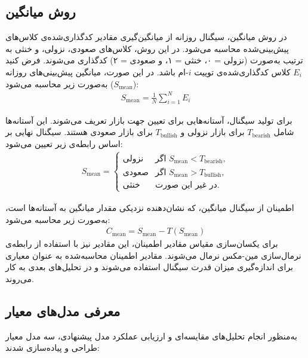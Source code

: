 \subsection{روش میانگین}
در روش میانگین، سیگنال روزانه از میانگین‌گیری مقادیر کدگذاری‌شده‌ی کلاس‌های پیش‌بینی‌شده محاسبه می‌شود. در این روش، کلاس‌های صعودی، نزولی، و خنثی به ترتیب به‌صورت (نزولی = ۰، خنثی = ۱، و صعودی = ۲) کدگذاری می‌شوند.
فرض کنید \( E_i \) کلاس کدگذاری‌شده‌ی توییت \( i \)-ام باشد. در این صورت، میانگین پیش‌بینی‌های روزانه (\( S_{\text{mean}} \)) به‌صورت زیر محاسبه می‌شود:
\begin{align}
S_{\text{mean}} = \frac{1}{N} \sum_{i=1}^{N} E_i
\end{align}

برای تولید سیگنال، آستانه‌هایی برای تعیین جهت بازار تعریف می‌شوند. این آستانه‌ها شامل \( T_{\text{bearish}} \) برای بازار نزولی و \( T_{\text{bullish}} \) برای بازار صعودی هستند. سیگنال نهایی بر اساس رابطه‌ی زیر تعیین می‌شود:
\begin{align}
S_{\text{mean}} =
\begin{cases} 
\text{نزولی} & \text{اگر } S_{\text{mean}} < T_{\text{bearish}}, \\
\text{صعودی} & \text{اگر } S_{\text{mean}} > T_{\text{bullish}}, \\
\text{خنثی} & \text{در غیر این صورت.}
\end{cases}
\end{align}

اطمینان از سیگنال میانگین، که نشان‌دهنده نزدیکی مقدار میانگین به آستانه‌ها است، به‌صورت زیر محاسبه می‌شود:
\begin{align}
C_{\text{mean}} = S_{\text{mean}} - T(S_{\text{mean}})
\end{align}
برای یکسان‌سازی مقیاس مقادیر اطمینان، این مقادیر نیز با استفاده از رابطه‌ی نرمال‌سازی مین-مکس نرمال می‌شوند. مقادیر اطمینان محاسبه‌شده به عنوان معیاری برای اندازه‌گیری میزان قدرت سیگنال استفاده می‌شوند و در تحلیل‌های بعدی به کار می‌روند.

\subsection{معرفی مدل‌های معیار}
\label{subsec:benchmarks}

به‌منظور انجام تحلیل‌های مقایسه‌ای و ارزیابی عملکرد مدل پیشنهادی، سه مدل معیار طراحی و پیاده‌سازی شدند: 

